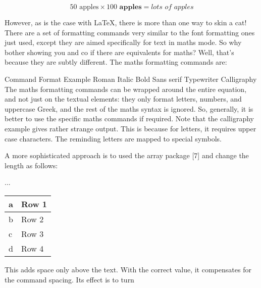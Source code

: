 \begin{equation}
  50 \textrm{ apples} \times 100 \textbf{ apples} = 
  \textit{lots of apples}
\end{equation}

However, as is the case with LaTeX, there is more than one way to skin a cat! There are a set of formatting commands very similar to the font formatting ones just used, except they are aimed specifically for text in maths mode. So why bother showing you \textrm and co if there are equivalents for maths? Well, that's because they are subtly different. The maths formatting commands are:

Command	Format	Example
	Roman	
	Italic	
	Bold	
	Sans serif	
	Typewriter	
	Calligraphy	
The maths formatting commands can be wrapped around the entire equation, and not just on the textual elements: they only format letters, numbers, and uppercase Greek, and the rest of the maths syntax is ignored. So, generally, it is better to use the specific maths commands if required. Note that the calligraphy example gives rather strange output. This is because for letters, it requires upper case characters. The reminding letters are mapped to special symbols.




A more sophisticated approach is to used the array package [7] and change the
length \extrarowheight as follows:
\usepackage{array}
...
{ %
\setlength{\extrarowheight}{1.5pt}
\begin{tabular}{|l|l|}
\hline
a & Row 1 \\ \hline
b & Row 2 \\ \hline
c & Row 3 \\
d & Row 4 \\ \hline
\end{tabular}
}
This adds space only above the text. With the correct value, it compensates for
the \hline command spacing. Its effect is to turn



